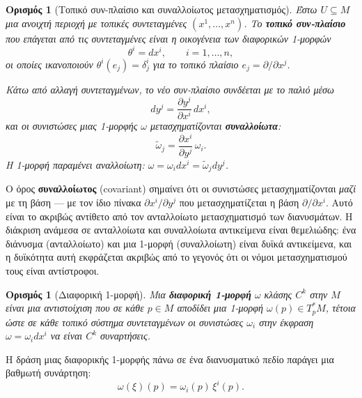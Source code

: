 \documentclass[11pt,a4paper,twoside,openright]{book}
\newtheorem{definition}[lemma]{Ορισμός}
\begin{document}
\begin{definition}[Τοπικό συν-πλαίσιο και συναλλοίωτος μετασχηματισμός]
Έστω $U \subseteq M$ μια ανοιχτή περιοχή με τοπικές συντεταγμένες $(x^1, \dots, x^n)$. Το \textbf{τοπικό συν-πλαίσιο} που επάγεται από τις συντεταγμένες είναι η οικογένεια των διαφορικών 1-μορφών
\begin{equation}
\theta^i = dx^i, \qquad i = 1, \dots, n,
\end{equation}
οι οποίες ικανοποιούν $\theta^i(e_j) = \delta^i_j$ για το τοπικό πλαίσιο $e_j = \partial / \partial x^j$.

Κάτω από αλλαγή συντεταγμένων, το νέο συν-πλαίσιο συνδέεται με το παλιό μέσω
\begin{equation}
dy^j = \frac{\partial y^j}{\partial x^i} \, dx^i,
\end{equation}
και οι συνιστώσες μιας 1-μορφής $\omega$ μετασχηματίζονται \textbf{συναλλοίωτα}:
\begin{equation}
\tilde{\omega}_j = \frac{\partial x^i}{\partial y^j} \, \omega_i.
\end{equation}
Η 1-μορφή παραμένει αναλλοίωτη: $\omega = \omega_i dx^i = \tilde{\omega}_j dy^j$.
\end{definition}

Ο όρος \textbf{συναλλοίωτος} (covariant) σημαίνει ότι οι συνιστώσες μετασχηματίζονται \emph{μαζί} με τη βάση --- με τον ίδιο πίνακα $\partial x^i / \partial y^j$ που μετασχηματίζεται η βάση $\partial / \partial x^i$. Αυτό είναι το ακριβώς αντίθετο από τον ανταλλοίωτο μετασχηματισμό των διανυσμάτων. Η διάκριση ανάμεσα σε ανταλλοίωτα και συναλλοίωτα αντικείμενα είναι θεμελιώδης: ένα διάνυσμα (ανταλλοίωτο) και μια 1-μορφή (συναλλοίωτη) είναι δυϊκά αντικείμενα, και η δυϊκότητα αυτή εκφράζεται ακριβώς από το γεγονός ότι οι νόμοι μετασχηματισμού τους είναι αντίστροφοι.

\begin{definition}[Διαφορική 1-μορφή]
Μια \textbf{διαφορική 1-μορφή} $\omega$ κλάσης $C^k$ στην $M$ είναι μια αντιστοίχιση που σε κάθε $p \in M$ αποδίδει μια 1-μορφή $\omega(p) \in T_p^*M$, τέτοια ώστε σε κάθε τοπικό σύστημα συντεταγμένων οι συνιστώσες $\omega_i$ στην έκφραση $\omega = \omega_i dx^i$ να είναι $C^k$ συναρτήσεις.
\end{definition}

Η δράση μιας διαφορικής 1-μορφής πάνω σε ένα διανυσματικό πεδίο παράγει μια βαθμωτή συνάρτηση:
\begin{equation}
\omega(\xi)(p) = \omega_i(p) \, \xi^i(p).
\end{equation}
\end{document}

